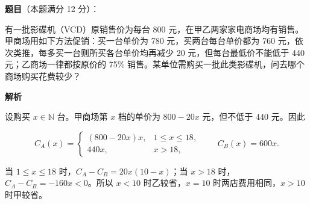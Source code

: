 \begin{answer}

\textbf{题目}（本题满分 12 分）：

有一批影碟机（VCD）原销售价为每台 800 元，在甲乙两家家电商场均有销售。甲商场用如下方法促销：买一台单价为 780 元，买两台每台单价都为 760 元，依次类推，每多买一台则所买各台单价均再减少 20 元，但每台最低价不能低于 440 元；乙商场一律都按原价的 75\% 销售。某单位需购买一批此类影碟机，问去哪个商场购买花费较少？

\textbf{解析}

设购买 $x\in\mathbb N$ 台。甲商场第 $x$ 档的单价为 $800-20x$ 元，但不低于 $440$ 元。因此

\nopagebreak[4]
\[
C_A(x)=\begin{cases}(800-20x)x,&1\le x\le18,\\440x,&x>18,\end{cases}
\qquad C_B(x)=600x.
\]

当 $1\le x\le18$ 时，$C_A-C_B=20x(10-x)$；当 $x>18$ 时，$C_A-C_B=-160x<0$。所以 $x<10$ 时乙较省，$x=10$ 时两店费用相同，$x>10$ 时甲较省。


\end{answer}
